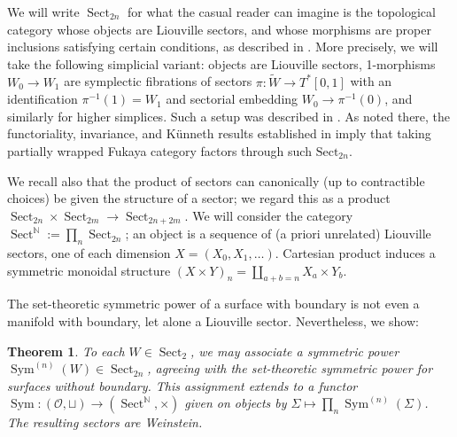 \documentclass{article}
\def\N{\mathbb{N}}
\DeclareMathOperator{\Sect}{Sect}
\DeclareMathOperator{\Sym}{Sym}
\newtheorem{theorem}{Theorem}[section]
\theoremstyle{definition}
\begin{document}
\vspace{2mm}



We will write $\Sect_{2n}$ for what the casual reader can imagine is the topological category whose objects are  Liouville sectors, and whose morphisms are proper inclusions satisfying certain conditions, as described in \cite{GPS1,GPS2}.  More precisely, we will take the following  simplicial variant: objects are Liouville sectors, 1-morphisms $W_0 \to W_1$ are symplectic fibrations of sectors $\pi: \widetilde{W} \to T^*[0,1]$ with an identification $\pi^{-1}(1) = W_1$ and sectorial embedding $W_0 \to \pi^{-1}(0)$, and similarly for higher simplices.  Such a setup was described in \cite{Lazarev-Sylvan-Tanaka}.  As noted there, the functoriality, invariance, and K\"unneth results established in \cite{GPS1, GPS2} imply that taking partially wrapped Fukaya category factors through such  $\mathrm{Sect}_{2n}$. 

We recall also that the product of sectors can canonically (up to contractible choices) be given the structure of a sector; we regard this as a product $\Sect_{2n} \times \Sect_{2m} \to \Sect_{2n+2m}$.  
We will consider the category  $\Sect^\N := \prod_n \Sect_{2n}$;
an object is a sequence of (a priori unrelated) Liouville sectors, one of each dimension $X = (X_0, X_1, \ldots)$. 
Cartesian product induces a symmetric monoidal structure $(X \times Y)_n = \coprod_{a+b = n} X_a \times Y_b$. 

The set-theoretic symmetric power of a surface with boundary is not even a manifold with boundary, let alone a Liouville sector.  Nevertheless, we show: 

\begin{theorem} \label{thm: functor}
    To each $W \in \Sect_2$, we may associate a symmetric power $\Sym^{(n)}(W) \in \Sect_{2n}$, agreeing with the set-theoretic symmetric power for surfaces without boundary. 
    This assignment extends to a functor 
    $\Sym: (\mathscr{O}, \sqcup) \to (\Sect^{\N}, \times)$
     given on objects by $\Sigma \mapsto \prod_n \Sym^{(n)}(\Sigma)$. The resulting sectors are Weinstein.
\end{theorem}
\end{document}
